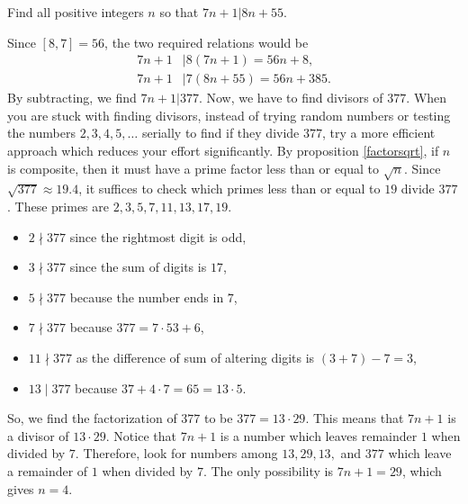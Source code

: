 \documentclass{subfile}
\begin{document}
		\begin{problem}
			Find all positive integers $n$ so that $7n+1|8n+55$.
		\end{problem}

		\begin{solution}
			Since $[8,7]=56$, the two required relations would be
				\begin{align*}
					7n+1 & |8(7n+1)=56n+8,\\
					7n+1 & |7(8n+55)=56n+385.
				\end{align*}
			By subtracting, we find $7n+1|377$. Now, we have to find divisors of $377$. When you are stuck with finding divisors, instead of trying random numbers or testing the numbers $2,3,4,5,\ldots$ serially to find if they divide $377$, try a more efficient approach which reduces your effort significantly. By proposition \eqref{factorsqrt}, if $n$ is composite, then it must have a prime factor less than or equal to $\sqrt{n}$.  Since $\sqrt{377} \approx 19.4$, it suffices to check which primes less than or equal to $19$ divide $377$. These primes are $2,3,5,7,11,13,17,19$.
				\begin{itemize}
					\item $2 \nmid 377$ since the rightmost digit is odd,
					\item $3 \nmid 377$ since the sum of digits is $17$,
					\item $5 \nmid 377$ because the number ends in $7$,
					\item $7 \nmid 377$ because $377=7\cdot53+6$,
					\item $11 \nmid 377$ as the difference of sum of altering digits is $(3+7)-7=3$,
					\item $13 \mid 377$ because $37 + 4 \cdot 7 = 65 = 13 \cdot 5$.
				\end{itemize}
			So, we find the factorization of $377$ to be $377=13 \cdot 29$. This means that $7n+1$ is a divisor of $13 \cdot 29$. Notice that $7n+1$ is a number which leaves remainder $1$ when divided by $7$. Therefore, look for numbers among $13, 29, 13, $ and $377$ which leave a remainder of $1$ when divided by $7$. The only possibility is $7n+1=29$, which gives $n=4$.
		\end{solution}
\end{document}
